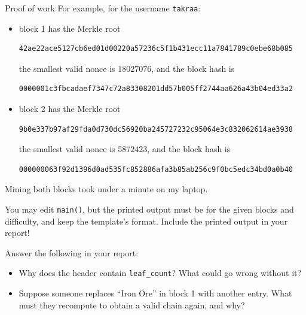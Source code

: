 \documentclass{homework}
\begin{document}
\begin{task}{Proof of work}
  For example, for the username \texttt{takraa}:
  \begin{itemize}
    \item block 1 has the Merkle root
    \begin{Verbatim}
42ae22ace5127cb6ed01d00220a57236c5f1b431ecc11a7841789c0ebe68b085
    \end{Verbatim}
    the smallest valid nonce is $18027076$, and the block hash is
    \begin{Verbatim}
0000001c3fbcadaef7347c72a83308201dd57b005ff2744aa626a43b04ed33a2
    \end{Verbatim}
    \item block 2 has the Merkle root
    \begin{Verbatim}
9b0e337b97af29fda0d730dc56920ba245727232c95064e3c832062614ae3938
    \end{Verbatim}
    the smallest valid nonce is $5872423$, and the block hash is
    \begin{Verbatim}
000000063f92d1396d0ad535fc852886afa3b85ab256c9f0bc5edc34bd0a0b40
    \end{Verbatim}
  \end{itemize}
  Mining both blocks took under a minute on my laptop.

  You may edit \texttt{main()}, but the printed output must be for the given blocks and difficulty, and keep the template's format.
  Include the printed output in your report!

  Answer the following in your report:
  \begin{itemize}
    \item Why does the header contain \texttt{leaf\_count}?
    What could go wrong without it?
    \item Suppose someone replaces \enquote{Iron Ore} in block 1 with another entry.
    What must they recompute to obtain a valid chain again, and why?
  \end{itemize}
\end{task}
\end{document}
